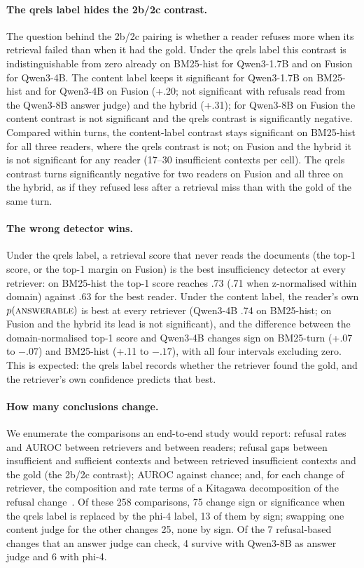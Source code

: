 \documentclass[11pt]{article}
\begin{document}
\paragraph{The qrels label hides the 2b/2c contrast.}
The question behind the 2b/2c pairing is whether a reader refuses more when its retrieval failed than when it had the gold. Under the qrels label this contrast is indistinguishable from zero already on BM25-hist for Qwen3-1.7B and on Fusion for Qwen3-4B. The content label keeps it significant for Qwen3-1.7B on BM25-hist and for Qwen3-4B on Fusion (+.20; not significant with refusals read from the Qwen3-8B answer judge) and the hybrid (+.31); for Qwen3-8B on Fusion the content contrast is not significant and the qrels contrast is significantly negative. Compared within turns, the content-label contrast stays significant on BM25-hist for all three readers, where the qrels contrast is not; on Fusion and the hybrid it is not significant for any reader (17--30 insufficient contexts per cell). The qrels contrast turns significantly negative for two readers on Fusion and all three on the hybrid, as if they refused less after a retrieval miss than with the gold of the same turn.

\paragraph{The wrong detector wins.}
Under the qrels label, a retrieval score that never reads the documents (the top-1 score, or the top-1 margin on Fusion) is the best insufficiency detector at every retriever: on BM25-hist the top-1 score reaches .73 (.71 when z-normalised within domain) against .63 for the best reader. Under the content label, the reader's own $p(\textsc{answerable})$ is best at every retriever (Qwen3-4B .74 on BM25-hist; on Fusion and the hybrid its lead is not significant), and the difference between the domain-normalised top-1 score and Qwen3-4B changes sign on BM25-turn (+.07 to $-.07$) and BM25-hist (+.11 to $-.17$), with all four intervals excluding zero. This is expected: the qrels label records whether the retriever found the gold, and the retriever's own confidence predicts that best.

\paragraph{How many conclusions change.}
We enumerate the comparisons an end-to-end study would report: refusal rates and AUROC between retrievers and between readers; refusal gaps between insufficient and sufficient contexts and between retrieved insufficient contexts and the gold (the 2b/2c contrast); AUROC against chance; and, for each change of retriever, the composition and rate terms of a Kitagawa decomposition of the refusal change~\cite{kitagawa1955components}. Of these 258 comparisons, 75 change sign or significance when the qrels label is replaced by the phi-4 label, 13 of them by sign; swapping one content judge for the other changes 25, none by sign. Of the 7 refusal-based changes that an answer judge can check, 4 survive with Qwen3-8B as answer judge and 6 with phi-4.
\end{document}
